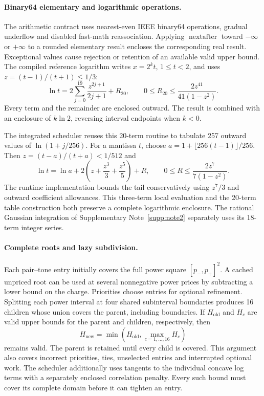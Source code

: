 \documentclass[10pt,letterpaper]{article}
\begin{document}
\paragraph{Binary64 elementary and logarithmic operations.}
The arithmetic contract uses nearest-even IEEE binary64 operations, gradual underflow and disabled fast-math reassociation. Applying \(\operatorname{nextafter}\) toward \(-\infty\) or \(+\infty\) to a rounded elementary result encloses the corresponding real result. Exceptional values cause rejection or retention of an available valid upper bound. The compiled reference logarithm writes \(x=2^k t\), \(1\leq t<2\), and uses \(z=(t-1)/(t+1)\leq1/3\):
\begin{equation}
 \ln t=2\sum_{j=0}^{19}\frac{z^{2j+1}}{2j+1}+R_{20},
 \qquad
 0\leq R_{20}\leq\frac{2z^{41}}{41(1-z^2)}.
 \label{supp:eq:binarylog}
\end{equation}
Every term and the remainder are enclosed outward. The result is combined with an enclosure of \(k\ln2\), reversing interval endpoints when \(k<0\).

The integrated scheduler reuses this 20-term routine to tabulate 257 outward values of \(\ln(1+j/256)\). For a mantissa \(t\), choose \(a=1+\lfloor256(t-1)\rfloor/256\). Then \(z=(t-a)/(t+a)<1/512\) and
\[
 \ln t=\ln a+2\left(z+\frac{z^3}{3}+\frac{z^5}{5}\right)+R,
 \qquad 0\leq R\leq\frac{2z^7}{7(1-z^2)}.
\]
The runtime implementation bounds the tail conservatively using \(z^7/3\) and outward coefficient allowances. This three-term local evaluation and the 20-term table construction both preserve a complete logarithmic enclosure. The rational Gaussian integration of Supplementary Note~\ref{supp:note2} separately uses its 18-term integer series.

\paragraph{Complete roots and lazy subdivision.}
Each pair--tone entry initially covers the full power square \([p_-,p_+]^2\). A cached unpriced root can be used at several nonnegative power prices by subtracting a lower bound on the charge. Priorities choose entries for optional refinement. Splitting each power interval at four shared subinterval boundaries produces 16 children whose union covers the parent, including boundaries. If \(H_{\mathrm{old}}\) and \(H_c\) are valid upper bounds for the parent and children, respectively, then
\begin{equation}
 H_{\mathrm{new}}=\min\!\left(H_{\mathrm{old}},\max_{c=1,\ldots,16}H_c\right)
 \label{supp:eq:lazyroot}
\end{equation}
remains valid. The parent is retained until every child is covered. This argument also covers incorrect priorities, ties, unselected entries and interrupted optional work. The scheduler additionally uses tangents to the individual concave log terms with a separately enclosed correlation penalty. Every such bound must cover its complete domain before it can tighten an entry.
\end{document}
